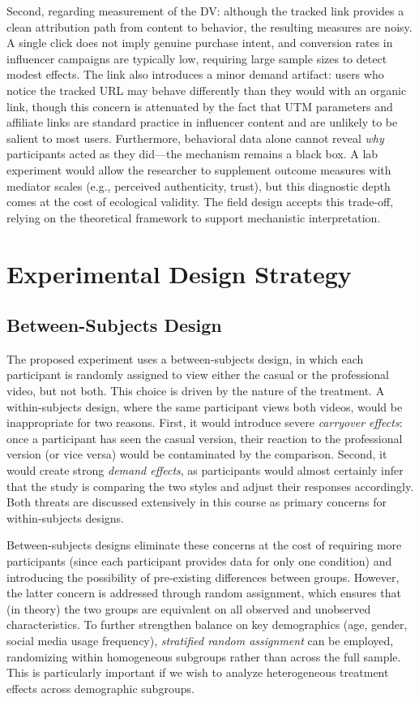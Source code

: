 \documentclass[10pt]{article}
\begin{document}
Second, regarding measurement of the DV: although the tracked link provides a clean attribution path from content to behavior, the resulting measures are noisy. A single click does not imply genuine purchase intent, and conversion rates in influencer campaigns are typically low, requiring large sample sizes to detect modest effects. The link also introduces a minor demand artifact: users who notice the tracked URL may behave differently than they would with an organic link, though this concern is attenuated by the fact that UTM parameters and affiliate links are standard practice in influencer content and are unlikely to be salient to most users. Furthermore, behavioral data alone cannot reveal \textit{why} participants acted as they did---the mechanism remains a black box. A lab experiment would allow the researcher to supplement outcome measures with mediator scales (e.g., perceived authenticity, trust), but this diagnostic depth comes at the cost of ecological validity. The field design accepts this trade-off, relying on the theoretical framework to support mechanistic interpretation.

\section{Experimental Design Strategy}

\subsection{Between-Subjects Design}

The proposed experiment uses a between-subjects design, in which each participant is randomly assigned to view either the casual or the professional video, but not both. This choice is driven by the nature of the treatment. A within-subjects design, where the same participant views both videos, would be inappropriate for two reasons. First, it would introduce severe \textit{carryover effects}: once a participant has seen the casual version, their reaction to the professional version (or vice versa) would be contaminated by the comparison. Second, it would create strong \textit{demand effects}, as participants would almost certainly infer that the study is comparing the two styles and adjust their responses accordingly. Both threats are discussed extensively in this course as primary concerns for within-subjects designs.

Between-subjects designs eliminate these concerns at the cost of requiring more participants (since each participant provides data for only one condition) and introducing the possibility of pre-existing differences between groups. However, the latter concern is addressed through random assignment, which ensures that (in theory) the two groups are equivalent on all observed and unobserved characteristics. To further strengthen balance on key demographics (age, gender, social media usage frequency), \textit{stratified random assignment} can be employed, randomizing within homogeneous subgroups rather than across the full sample. This is particularly important if we wish to analyze heterogeneous treatment effects across demographic subgroups.
\end{document}
